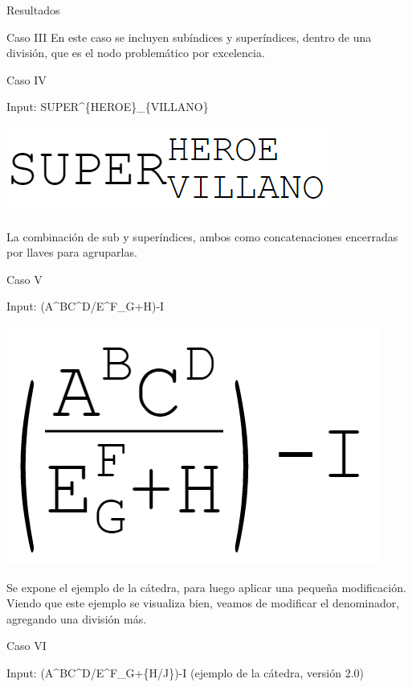 \begin{section}{Resultados}
\begin{subsection}{Caso III}
En este caso se incluyen sub\'indices y super\'indices, dentro de una divisi\'on, que es el nodo problem\'atico por excelencia.

\end{subsection}
\begin{subsection}{Caso IV}

Input: SUPER\^{}\{HEROE\}\_\{VILLANO\}

\includegraphics[scale=0.5]{./imgs/super.png}

La combinaci\'on de sub y super\'indices, ambos como concatenaciones encerradas por llaves para agruparlas.

\end{subsection}

\begin{subsection}{Caso V}

Input: (A\^{}BC\^{}D/E\^{}F\_G+H)-I

\includegraphics[scale=0.5]{./imgs/catedra.png}

Se expone el ejemplo de la c\'atedra, para luego aplicar una peque\~na modificaci\'on. Viendo que este ejemplo se visualiza bien, veamos de modificar el denominador, agregando una divisi\'on m\'as.

\end{subsection}

\begin{subsection}{Caso VI}

Input: (A\^{}BC\^{}D/E\^{}F\_G+\{H/J\})-I (ejemplo de la c\'atedra, versi\'on 2.0)


\end{subsection}
\end{section}

